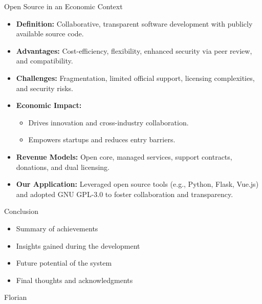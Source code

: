 \documentclass{beamer}
\begin{document}
\begin{frame}{Open Source in an Economic Context}
  \begin{itemize}
    \item \textbf{Definition:} Collaborative, transparent software development with publicly available source code.
    \item \textbf{Advantages:} Cost-efficiency, flexibility, enhanced security via peer review, and compatibility.
    \item \textbf{Challenges:} Fragmentation, limited official support, licensing complexities, and security risks.
    \item \textbf{Economic Impact:} 
      \begin{itemize}
        \item Drives innovation and cross-industry collaboration.
        \item Empowers startups and reduces entry barriers.
      \end{itemize}
    \item \textbf{Revenue Models:} Open core, managed services, support contracts, donations, and dual licensing.
    \item \textbf{Our Application:} Leveraged open source tools (e.g., Python, Flask, Vue.js) and adopted GNU GPL-3.0 to foster collaboration and transparency.
  \end{itemize}
\end{frame}


\begin{frame}{Conclusion}
  \begin{itemize}
    \item Summary of achievements
    \item Insights gained during the development
    \item Future potential of the system
    \item Final thoughts and acknowledgments
  \end{itemize}
\end{frame}

\begin{frame}{Florian}
  
\end{frame}
\end{document}
